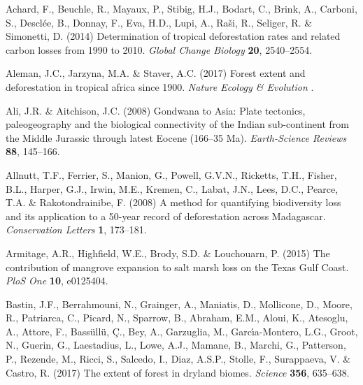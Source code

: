 \documentclass[a4paper, 12pt, leqno]{article} %
\begin{document}
\begin{thebibliography}{60}
\providecommand{\natexlab}[1]{#1}

Achard, F., Beuchle, R., Mayaux, P., Stibig, H.J., Bodart, C., Brink, A.,
  Carboni, S., Desclée, B., Donnay, F., Eva, H.D., Lupi, A., Raši, R.,
  Seliger, R. \& Simonetti, D. (2014) Determination of tropical deforestation
  rates and related carbon losses from 1990 to 2010. \emph{Global Change
  Biology} \textbf{20}, 2540--2554.

Aleman, J.C., Jarzyna, M.A. \& Staver, A.C. (2017) Forest extent and
  deforestation in tropical africa since 1900. \emph{Nature Ecology \&
  Evolution} .

Ali, J.R. \& Aitchison, J.C. (2008) {Gondwana to Asia: Plate tectonics,
  paleogeography and the biological connectivity of the Indian sub-continent
  from the Middle Jurassic through latest Eocene (166--35 Ma)}.
  \emph{Earth-Science Reviews} \textbf{88}, 145--166.

Allnutt, T.F., Ferrier, S., Manion, G., Powell, G.V.N., Ricketts, T.H., Fisher,
  B.L., Harper, G.J., Irwin, M.E., Kremen, C., Labat, J.N., Lees, D.C., Pearce,
  T.A. \& Rakotondrainibe, F. (2008) {A method for quantifying biodiversity
  loss and its application to a 50-year record of deforestation across
  Madagascar}. \emph{Conservation Letters} \textbf{1}, 173--181.

Armitage, A.R., Highfield, W.E., Brody, S.D. \& Louchouarn, P. (2015) {The
  contribution of mangrove expansion to salt marsh loss on the Texas Gulf
  Coast}. \emph{PloS One} \textbf{10}, e0125404.

Bastin, J.F., Berrahmouni, N., Grainger, A., Maniatis, D., Mollicone, D.,
  Moore, R., Patriarca, C., Picard, N., Sparrow, B., Abraham, E.M., Aloui, K.,
  Atesoglu, A., Attore, F., Bass{\"u}ll{\"u}, {\c C}., Bey, A., Garzuglia, M.,
  Garc{\'\i}a-Montero, L.G., Groot, N., Guerin, G., Laestadius, L., Lowe, A.J.,
  Mamane, B., Marchi, G., Patterson, P., Rezende, M., Ricci, S., Salcedo, I.,
  Diaz, A.S.P., Stolle, F., Surappaeva, V. \& Castro, R. (2017) The extent of
  forest in dryland biomes. \emph{Science} \textbf{356}, 635--638.


\end{thebibliography}
\end{document}
